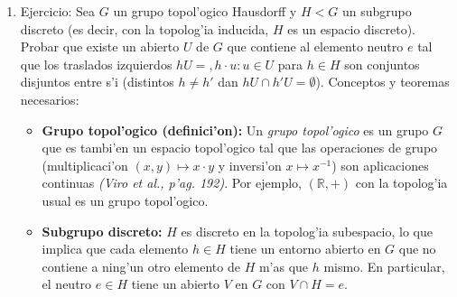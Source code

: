\documentclass[a4paper,11pt]{article}  %
\begin{document}
\begin{enumerate}
\begin{itemize}
\item \textbf{Hausdorff en cocientes:} Un criterio cl'asico: si $X$ es Hausdorff \emph{y} cada clase de equivalencia $[x]$ es cerrada en $X$, entonces el cociente $X/!\sim$ es Hausdorff. Sin embargo, aqu'i la clase ${0,1/1,1/2,\dots}$ no es cerrada en $\mathbb{R}$ (su clausura contiene $0$, que est'a en la clase misma, pero no introduce m'as puntos fuera). El punto clave es que $0$ est'a adherido a todos $1/n$ en $\mathbb{R}$, lo que en el cociente implica que la imagen de esta clase ser'a un punto l'imite de s'i mismo, haciendo que $X$ no sea $T_1$ (y por ende no $T_2$). En efecto, $X$ no es Hausdorff porque la identificaci'on de la secuencia $1/n$ con su l'imite $0$ produce un punto en $X$ que no puede separarse de s'i mismo por abiertos distintos (formalmente, la imagen de la clase ${0,1/n}$ no est'a aislada de “copia extra” alguna, generando no-Hausdorff) \emph{(Munkres, p'ag. 170)}.
\item Nota: En las soluciones, se espera concluir que $p$ es abierta pero no cerrada (o viceversa, seg'un un an'alisis cuidadoso de saturaci'on de abiertos en $\mathbb{R}$). Tambi'en que $X$ \emph{no} es Hausdorff (por la identificaci'on de $0$ con $1/n$) y que $X$ \emph{no} es compacto (ya que $\mathbb{R}$ no lo es y $p$ no es cerrado). Cada conclusi'on debe justificarse con una construcci'on de conjuntos abiertos/cerrados adecuados y usando las propiedades topol'ogicas mencionadas.
\end{itemize} \item Ejercicio: Sea $G$ un grupo topol'ogico Hausdorff y $H<G$ un subgrupo discreto (es decir, con la topolog'ia inducida, $H$ es un espacio discreto). Probar que existe un abierto $U$ de $G$ que contiene al elemento neutro $e$ tal que los traslados izquierdos $hU = {,h\cdot u: u\in U}$ para $h\in H$ son conjuntos disjuntos entre s'i (distintos $h\neq h'$ dan $hU \cap h'U = \emptyset$). Conceptos y teoremas necesarios:
\begin{itemize}
\item \textbf{Grupo topol'ogico (definici'on):} Un \emph{grupo topol'ogico} es un grupo $G$ que es tambi'en un espacio topol'ogico tal que las operaciones de grupo (multiplicaci'on $(x,y)\mapsto x\cdot y$ y inversi'on $x\mapsto x^{-1}$) son aplicaciones continuas \emph{(Viro et al., p'ag. 192)}. Por ejemplo, $(\mathbb{R},+)$ con la topolog'ia usual es un grupo topol'ogico.
\item \textbf{Subgrupo discreto:} $H$ es discreto en la topolog'ia subespacio, lo que implica que cada elemento $h\in H$ tiene un entorno abierto en $G$ que no contiene a ning'un otro elemento de $H$ m'as que $h$ mismo. En particular, el neutro $e\in H$ tiene un abierto $V$ en $G$ con $V\cap H={e}$.

\end{itemize}
\end{enumerate}
\end{document}
